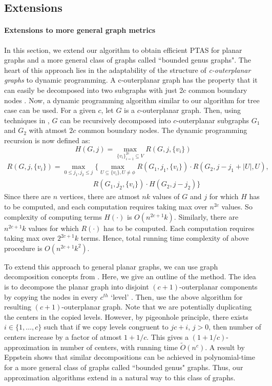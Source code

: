 \documentclass[11pt,onecolumn]{article}
\begin{document}
\subsection{Extensions} 
\paragraph{Extensions to more general graph metrics}
In this section, we extend our algorithm to obtain efficient PTAS
for planar graphs and a more general class of graphs called ``bounded genus graphs". The heart of this approach lies in the adaptability of the structure of {\it c-outerplanar graphs} to dynamic programming. A c-outerplanar graph has the property that it can easily be decomposed into two subgraphs with just 2c common boundary nodes \cite{baker94}. 
Now, a dynamic programming algorithm similar to our algorithm for tree case can be used. For a given $c$, let $G$ is a $c$-outerplanar graph. Then, using techniques in \cite{baker94}, $G$ can be recursively decomposed into $c$-outerplanar subgraphs $G_1$ and $G_2$ with atmost $2c$ common boundary nodes. The dynamic programming recursion is now defined as:
\[
H(G, j) = \max_{\{v_i\}_{i=1}^{2c} \subseteq V} R(G, j, \{v_i\})
\]
$$\begin{array}{l}
R(G, j, \{v_i\}) = \max_{0 \le j_1, j_2 \le j} \Big\{ \max_{U\subseteq \{v_i\}, U \ne \phi}  R(G_1, j_1, \{v_i\}) \cdot R(G_2, j-j_1+|U|,U), \\
					\hspace{2in}R(G_1, j_2, \{v_i\}) \cdot H(G_2, j-j_2) \Big\}
\end{array}
$$
Since there are $n$ vertices, there are atmost $nk$ values of $G$ and $j$ for which $H$ has to be computed, and each computation requires taking max over $n^{2c}$ values. So complexity of computing terms $H(\cdot)$ is $O(n^{2c+1}k)$. Similarly, there are $n^{2c+1}k$ values for which $R(\cdot)$ has to be computed. Each computation requires taking max over $2^{2c+1}k$ terms. Hence, total running time complexity of above procedure is $O(n^{2c+1}k^2)$. 

To extend this approach to general planar graphs, we can use graph decomposition concepts from \cite{baker94}. Here, we give an outline of the method. 
The idea is to decompose the planar graph into disjoint $(c+1)$-outerplanar components by copying the nodes in every $c^{th}$ `level' \cite{baker94}. Then, use the above algorithm for resulting $(c+1)$-outerplanar graph. Note that we are potentially duplicating the centers in the copied levels. However, by pigeonhole principle, there exists $i\in \{1,\ldots, c\}$ such that if we copy levels congruent to $jc+i$, $j>0$, then number of centers increase by a factor of atmost $1+1/c$. This gives a $(1+1/c)$-approximation in number of centers, with running time $\tilde{O}(n^c)$.
A result by Eppstein \cite{eppstein} shows that similar decompositions can be achieved in polynomial-time for a more general class of graphs called ``bounded genus" graphs. Thus, our approximation algorithms extend in a natural way to this class of graphs. 
\end{document}
